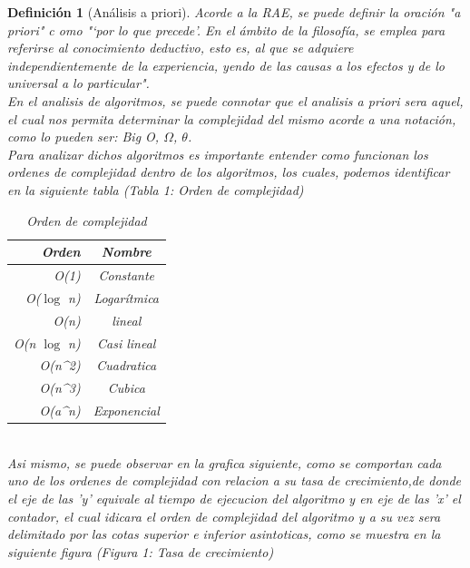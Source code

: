 \documentclass[12pt,twoside]{article}
\newtheorem{defi}{Definición}
\begin{document}
\clearpage
\begin{defi}[Análisis a priori]
Acorde a la RAE, se puede definir la oraci\'on "a priori" c
omo  "‘por lo que precede’. En el ámbito de la filosofía, se emplea para referirse al conocimiento deductivo, esto es, al que se adquiere independientemente de la experiencia, yendo de las causas a los efectos y de lo universal a lo particular".
\\
En el analisis de algoritmos, se puede connotar que el analisis a priori sera aquel, el cual nos permita determinar la complejidad del mismo acorde a una notación, como lo pueden ser: Big O, $\Omega$, $\theta$.
\\
Para analizar dichos algoritmos es importante entender como funcionan los ordenes de complejidad dentro de los algoritmos, los cuales, podemos identificar en la siguiente tabla (Tabla 1: Orden de complejidad)
\\
\begin{table}[h!]
    \centering
    \begin{tabular}{|N|C|}
    \hline
        Orden & Nombre \\
    \hline
        O(1) & Constante \\
    \hline
        O($\log$ n) & Logarítmica \\
    \hline
        O(n) & lineal\\
    \hline
        O(n $\log$ n) & Casi lineal \\
    \hline
        O(n^{2}) & Cuadratica\\
    \hline
        O(n^{3}) & Cubica\\
    \hline
        O(a^{n}) & Exponencial\\
    \hline
    \end{tabular}
    \caption{Orden de complejidad}
    \label{tab:my_label}
\end{table}
\\
Asi mismo, se puede observar en la grafica siguiente, como se comportan cada uno de los ordenes de complejidad con relacion a su tasa de crecimiento,de donde el eje de las 'y' equivale al tiempo de ejecucion del algoritmo y en eje de las 'x' el contador, el cual idicara el orden de complejidad del algoritmo y a su vez sera delimitado por las cotas superior e inferior asintoticas, como se muestra en la siguiente figura (Figura 1: Tasa de crecimiento)


\end{defi}
\end{document}
